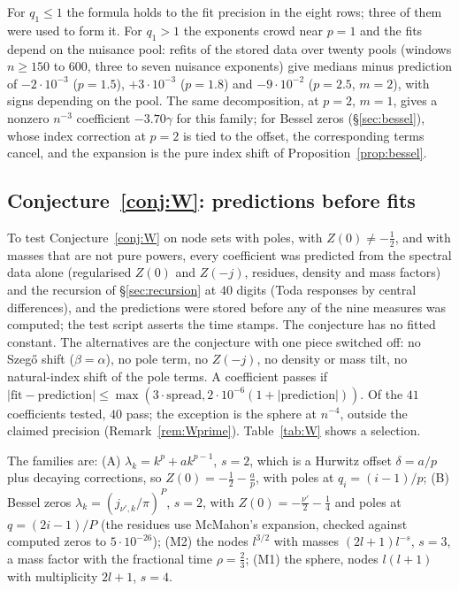 For $q_1\le1$ the formula holds to the fit precision in the eight rows; three of them were used to form it. For $q_1>1$
the exponents crowd near $p=1$ and the fits depend on the nuisance pool: refits of the stored data over twenty pools
(windows $n\ge150$ to $600$, three to seven nuisance exponents) give medians minus prediction of $-2\cdot10^{-3}$ ($p=1.5$),
$+3\cdot10^{-3}$ ($p=1.8$) and $-9\cdot10^{-2}$ ($p=2.5$, $m=2$), with signs depending on the pool. The same decomposition, at
$p=2$, $m=1$, gives a nonzero $n^{-3}$ coefficient $-3.70\gamma$ for this family; for Bessel zeros (\S\ref{sec:bessel}),
whose index correction at $p=2$ is tied to the offset, the corresponding terms cancel, and the expansion is the pure
index shift of Proposition~\ref{prop:bessel}.

\subsection{Conjecture~\ref{conj:W}: predictions before fits}\label{sec:num-W}
To test Conjecture~\ref{conj:W} on node sets with poles, with $Z(0)\ne-\frac12$, and with masses that are not pure powers, every
coefficient was predicted from the spectral data alone (regularised $Z(0)$ and $Z(-j)$, residues, density and mass factors) and the
recursion of \S\ref{sec:recursion} at $40$ digits (Toda responses by central differences), and the predictions were stored before
any of the nine measures was computed; the test script asserts the time stamps. The conjecture has no fitted constant. The
alternatives are the conjecture with one piece switched off: no Szeg\H{o} shift ($\beta=\alpha$), no pole term, no $Z(-j)$, no density or
mass tilt, no natural-index shift of the pole terms. A coefficient passes if $|\text{fit}-\text{prediction}|\le\max(3\cdot\text{spread},
2\cdot10^{-6}(1+|\text{prediction}|))$. Of the $41$ coefficients tested, $40$ pass; the exception is the sphere at $n^{-4}$, outside the
claimed precision (Remark~\ref{rem:Wprime}). Table~\ref{tab:W} shows a selection.

The families are: (A) $\lambda_k=k^p+ak^{p-1}$, $s=2$, which is a Hurwitz offset $\delta=a/p$ plus decaying corrections, so
$Z(0)=-\frac12-\frac ap$, with poles at $q_i=(i-1)/p$; (B) Bessel zeros $\lambda_k=(j_{\nu',k}/\pi)^P$, $s=2$, with $Z(0)=-\frac{\nu'}2-\frac14$
and poles at $q=(2i-1)/P$ (the residues use McMahon's expansion, checked against computed zeros to $5\cdot10^{-26}$); (M2) the nodes
$l^{3/2}$ with masses $(2l+1)l^{-s}$, $s=3$, a mass factor with the fractional time $\rho=\frac23$; (M1) the sphere, nodes $l(l+1)$ with
multiplicity $2l+1$, $s=4$.

